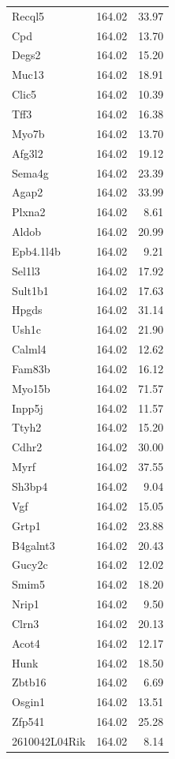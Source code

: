 \documentclass{article}
\begin{document}
\begin{boehm}
\begin{longtable}{lrr}
  Recql5 & 164.02 & 33.97 \\
  Cpd & 164.02 & 13.70 \\
  Degs2 & 164.02 & 15.20 \\
  Muc13 & 164.02 & 18.91 \\
  Clic5 & 164.02 & 10.39 \\
  Tff3 & 164.02 & 16.38 \\
  Myo7b & 164.02 & 13.70 \\
  Afg3l2 & 164.02 & 19.12 \\
  Sema4g & 164.02 & 23.39 \\
  Agap2 & 164.02 & 33.99 \\
  Plxna2 & 164.02 & 8.61 \\
  Aldob & 164.02 & 20.99 \\
  Epb4.1l4b & 164.02 & 9.21 \\
  Sel1l3 & 164.02 & 17.92 \\
  Sult1b1 & 164.02 & 17.63 \\
  Hpgds & 164.02 & 31.14 \\
  Ush1c & 164.02 & 21.90 \\
  Calml4 & 164.02 & 12.62 \\
  Fam83b & 164.02 & 16.12 \\
  Myo15b & 164.02 & 71.57 \\
  Inpp5j & 164.02 & 11.57 \\
  Ttyh2 & 164.02 & 15.20 \\
  Cdhr2 & 164.02 & 30.00 \\
  Myrf & 164.02 & 37.55 \\
  Sh3bp4 & 164.02 & 9.04 \\
  Vgf & 164.02 & 15.05 \\
  Grtp1 & 164.02 & 23.88 \\
  B4galnt3 & 164.02 & 20.43 \\
  Gucy2c & 164.02 & 12.02 \\
  Smim5 & 164.02 & 18.20 \\
  Nrip1 & 164.02 & 9.50 \\
  Clrn3 & 164.02 & 20.13 \\
  Acot4 & 164.02 & 12.17 \\
  Hunk & 164.02 & 18.50 \\
  Zbtb16 & 164.02 & 6.69 \\
  Osgin1 & 164.02 & 13.51 \\
  Zfp541 & 164.02 & 25.28 \\
  2610042L04Rik & 164.02 & 8.14 \\

\end{longtable}
\end{boehm}
\end{document}
